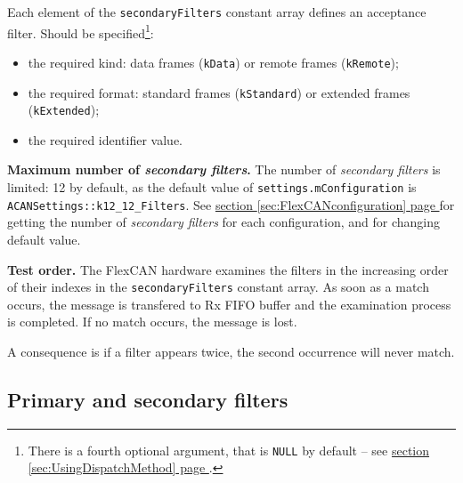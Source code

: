 \documentclass[10pt, a4paper, obeyspaces, openany]{extarticle}
\newcommand\refSectionPage[1]{\hyperref[sec:#1]{section \ref*{sec:#1} page \pageref{sec:#1}}}
\begin{document}
Each element of the \texttt{secondaryFilters} constant array defines an acceptance filter. Should be specified\footnote{There is a fourth optional argument, that is \texttt{NULL} by default -- see \refSectionPage{UsingDispatchMethod}.}:
\begin{itemize}
  \item the required kind: data frames (\texttt{kData}) or remote frames (\texttt{kRemote});
  \item the required format: standard frames (\texttt{kStandard}) or extended frames (\texttt{kExtended});
  \item the required identifier value.
\end{itemize}

{\bf Maximum number of \emph{secondary filters}.} The number of \emph{secondary filters} is limited: 12 by default, as the default value of \texttt{settings.mConfiguration} is \texttt{ACANSettings::k12\_12\_Filters}. See \refSectionPage{FlexCANconfiguration} for getting the number of \emph{secondary filters} for each configuration, and for changing default value.

{\bf Test order.} The FlexCAN hardware examines the filters in the increasing order of their indexes in the \texttt{secondaryFilters} constant array. As soon as a match occurs, the message is transfered to Rx FIFO buffer and the examination process is completed. If no match occurs, the message is lost.

A consequence is if a filter appears twice, the second occurrence will never match.



\subsection{Primary and secondary filters}
\end{document}
